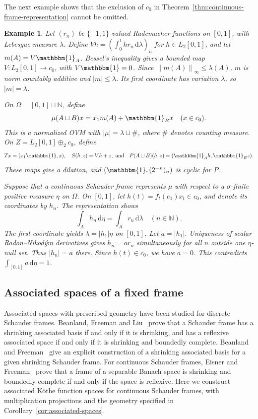 \documentclass[11pt,leqno]{amsart}
\theoremstyle{compact}
\numberwithin{equation}{section}
\theoremstyle{compactremark}
\newtheorem{example}[theorem]{Example}
\theoremstyle{compact}
\newcommand{\1}{\mathbbm{1}}
\newcommand{\rmd}{\mathrm{d}}
\newcommand{\N}{\mathbb{N}}
\newcommand{\norm}[1]{\left\|#1\right\|}
\newcommand{\abs}[1]{\left|#1\right|}
\begin{document}
\begingroup
The next example shows that the exclusion of $c_0$ in Theorem~\ref{thm:continuous-frame-representation} cannot be omitted.

\begin{example}\label{ex:c0-variation-no-frame}
Let $(r_n)$ be $\{-1,1\}$-valued Rademacher functions on $[0,1]$, with Lebesgue measure $\lambda$. Define $Vh=(\int_0^1h r_n\,\rmd\lambda)_n$ for $h\in L_2[0,1]$, and let $m(A)=V\1_A$. Bessel's inequality gives a bounded map $V\colon L_2[0,1]\to c_0$, with $V\1=0$. Since $\norm{m(A)}_\infty\leq\lambda(A)$, $m$ is norm countably additive and $\abs{m}\leq\lambda$. Its first coordinate has variation $\lambda$, so $\abs{m}=\lambda$.

On $\Omega=[0,1]\sqcup\N$, define
\[
\mu(A\sqcup B)x=x_1m(A)+\1_Bx\quad(x\in c_0).
\]
This is a normalized OVM with $\abs{\mu}=\lambda\sqcup\#$, where $\#$ denotes counting measure. On $Z=L_2[0,1]\oplus_2c_0$, define
\[
Tx=(x_1\1,x),\quad S(h,z)=Vh+z,\text{ and}\quad P(A\sqcup B)(h,z)=(\1_Ah,\1_Bz).
\]
These maps give a dilation, and $(\1,(2^{-n})_n)$ is cyclic for $P$.

Suppose that a continuous Schauder frame represents $\mu$ with respect to a $\sigma$-finite positive measure $\eta$ on $\Omega$. On $[0,1]$, let $h(t)=f_t(e_1)x_t\in c_0$, and denote its coordinates by $h_n$. The representation shows
\[
\int_Ah_n\,\rmd\eta=\int_A r_n\,\rmd\lambda\quad(n\in\N).
\]
The first coordinate yields $\lambda=\abs{h_1}\eta$ on $[0,1]$. Let $a=\abs{h_1}$. Uniqueness of scalar Radon--Nikod\'ym derivatives gives $h_n=a r_n$ simultaneously for all $n$ outside one $\eta$-null set. Thus $\abs{h_n}=a$ there. Since $h(t)\in c_0$, we have $a=0$. This contradicts $\int_{[0,1]}a\,\rmd\eta=1$.
\end{example}
\par\endgroup

\subsection{Associated spaces of a fixed frame}

Associated spaces with prescribed geometry have been studied for discrete Schauder frames. Beanland, Freeman and Liu~\cite[Theorem~1.5]{BeanlandFreemanLiu2015} prove that a Schauder frame has a shrinking associated basis if and only if it is shrinking, and has a reflexive associated space if and only if it is shrinking and boundedly complete. Beanland and Freeman~\cite{BeanlandFreeman2024} give an explicit construction of a shrinking associated basis for a given shrinking Schauder frame. For continuous Schauder frames, Eisner and Freeman~\cite[Theorem~3.11]{EisnerFreeman2020} prove that a frame of a separable Banach space is shrinking and boundedly complete if and only if the space is reflexive. Here we construct associated K\"othe function spaces for continuous Schauder frames, with multiplication projections and the geometry specified in Corollary~\ref{cor:associated-spaces}.
\end{document}
